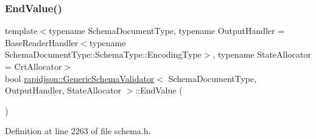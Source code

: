 \subsubsection{\texorpdfstring{EndValue()}{EndValue()}}
{\footnotesize\ttfamily template$<$typename Schema\+Document\+Type, typename Output\+Handler = Base\+Reader\+Handler$<$typename Schema\+Document\+Type\+::\+Schema\+Type\+::\+Encoding\+Type$>$, typename State\+Allocator = Crt\+Allocator$>$ \\
bool \mbox{\hyperlink{classrapidjson_1_1_generic_schema_validator}{rapidjson\+::\+Generic\+Schema\+Validator}}$<$ Schema\+Document\+Type, Output\+Handler, State\+Allocator $>$\+::End\+Value (\begin{DoxyParamCaption}{ }\end{DoxyParamCaption})\hspace{0.3cm}{\ttfamily [private]}}



Definition at line 2263 of file schema.\+h.



